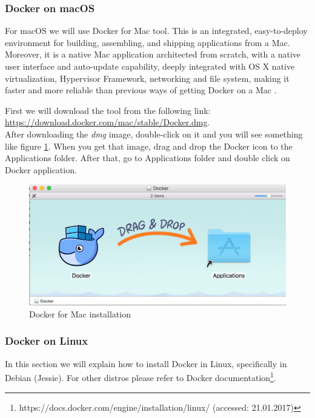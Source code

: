 \subsubsection{Docker on macOS}
For macOS we will use Docker for Mac tool. This is an integrated, easy-to-deploy environment for building, assembling, and shipping applications from a Mac. Moreover, it is a native Mac application architected from scratch, with a native user interface and auto-update capability, deeply integrated with OS X native virtualization, Hypervisor Framework, networking and file system, making it faster and more reliable than previous ways of getting Docker on a Mac \cite{Docker}.

First we will download the tool from the following link: \url{https://download.docker.com/mac/stable/Docker.dmg}.\\

After downloading the \textit{dmg} image, double-click on it and you will see something like figure \ref{fig:docker-mac-01}. When you get that image, drag and drop the Docker icon to the Applications folder. After that, go to Applications folder and double click on Docker application.

\begin{figure}[ht]
	\centering
    \includegraphics[width=\textwidth]{grafiken/docker-01}
    \caption{Docker for Mac installation}
    \label{fig:docker-mac-01}
\end{figure}

\subsubsection{Docker on Linux}
In this section we will explain how to install Docker in Linux, specifically in Debian (Jessie). For other distros please refer to Docker documentation\footnote{https://docs.docker.com/engine/installation/linux/ (accessed: 21.01.2017)}.

